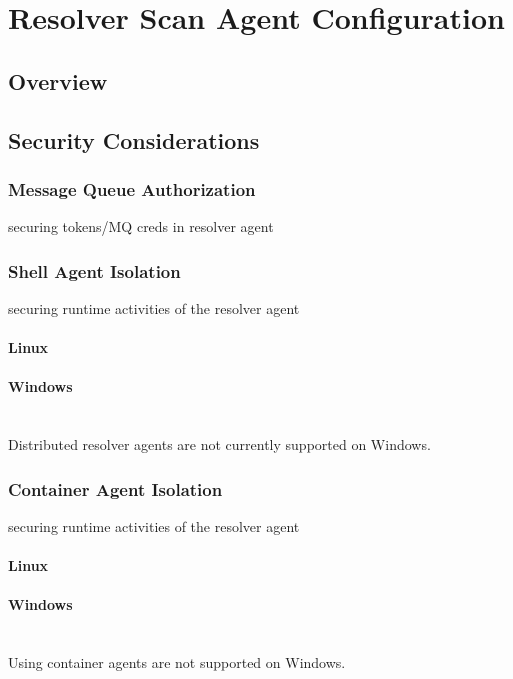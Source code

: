 \section{Resolver Scan Agent Configuration}\label{sec:resolver-agent}

\subsection{Overview}


\subsection{Security Considerations}\label{sec:resolver-agent-security}

\subsubsection{Message Queue Authorization}

securing tokens/MQ creds in resolver agent


\subsubsection{Shell Agent Isolation}

securing runtime activities of the resolver agent

\paragraph{Linux}

\paragraph{Windows}
\noindent\\Distributed resolver agents are not currently supported on Windows.


\subsubsection{Container Agent Isolation}

securing runtime activities of the resolver agent

\paragraph{Linux}

\paragraph{Windows}
\noindent\\Using container agents are not supported on Windows.


